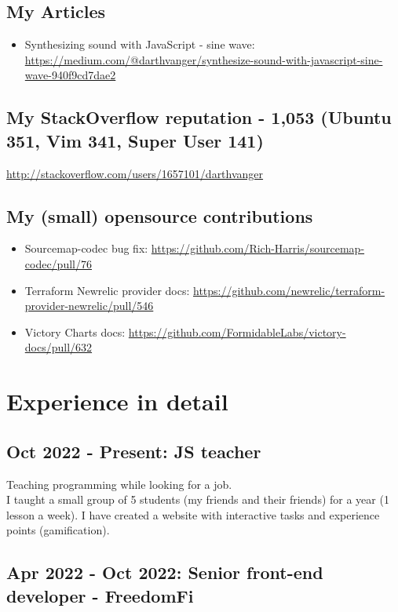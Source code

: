 \documentclass[a4paper, 14pt]{article}
\begin{document}
  \subsection{My Articles}
    \begin{itemize}
      \item Synthesizing sound with JavaScript - sine wave: \url{https://medium.com/@darthvanger/synthesize-sound-with-javascript-sine-wave-940f9cd7dae2}
    \end{itemize}

  \subsection{My StackOverflow reputation - 1,053 (Ubuntu 351, Vim 341, Super User 141)}
    \url{http://stackoverflow.com/users/1657101/darthvanger}

  \subsection{My (small) opensource contributions}
    \begin{itemize}
      \item Sourcemap-codec bug fix: \url{https://github.com/Rich-Harris/sourcemap-codec/pull/76} \\
      \item Terraform Newrelic provider docs: \url{https://github.com/newrelic/terraform-provider-newrelic/pull/546} \\
      \item Victory Charts docs: \url{https://github.com/FormidableLabs/victory-docs/pull/632}
    \end{itemize}

\section{Experience in detail}

  \subsection{Oct 2022 - Present: JS teacher}
    Teaching programming while looking for a job. \\
    I taught a small group of 5 students (my friends and their friends) for a year (1 lesson a week). I have created a website with interactive tasks and experience points (gamification).

  \subsection{Apr 2022 - Oct 2022: Senior front-end developer - FreedomFi}
\end{document}
